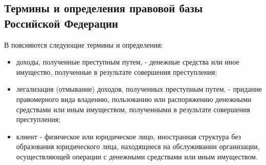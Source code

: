 \documentclass{article}
\begin{document}
\begin{itemize}[label={--}]
\end{itemize}

\hfil

\subsection{Термины и определения правовой базы Российской Федерации}

В \cite{fz115} поясняются следующие термины и определения:

\begin{itemize}[label={--}]
  \item доходы, полученные преступным путем, - денежные средства или иное имущество, полученные в результате совершения преступления;
  \item легализация (отмывание) доходов, полученных преступным путем, - придание правомерного вида владению, пользованию или распоряжению денежными средствами или иным имуществом, полученными в результате совершения преступления;
  \item клиент - физическое или юридическое лицо, иностранная структура без образования юридического лица, находящиеся на обслуживании организации, осуществляющей операции с денежными средствами или иным имуществом.
\end{itemize}
\end{document}
